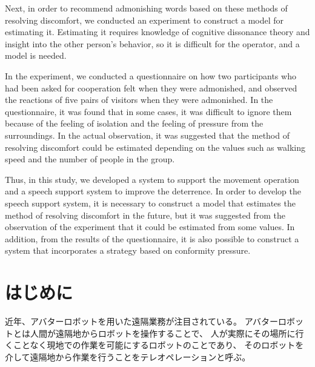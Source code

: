 \documentclass{kuisthesis}
\begin{document}
\begin{eabstract}
Next, in order to recommend admonishing words based on these methods of resolving discomfort, 
we conducted an experiment to construct a model for estimating it.
Estimating it requires knowledge of cognitive dissonance theory 
and insight into the other person's behavior, so it is difficult for the operator, and a model is needed.

In the experiment, we conducted a questionnaire on how two participants who had been asked for cooperation felt 
when they were admonished, and observed the reactions of five pairs of visitors when they were admonished.
In the questionnaire, it was found that in some cases,
it was difficult to ignore them because of the feeling of isolation and the feeling of pressure from the surroundings. 
In the actual observation, it was suggested that the method of resolving 
discomfort could be estimated depending on the values such as walking speed 
and the number of people in the group.

Thus, in this study, we developed a system to support the movement operation and a speech support system to improve the deterrence.
In order to develop the speech support system, it is necessary to construct a model that estimates the method of resolving discomfort in the future, 
but it was suggested from the observation of the experiment that it could be estimated from some values. In addition, from the results of the questionnaire, it is also possible to construct a system that incorporates a strategy based on conformity pressure.

\end{eabstract}

\tableofcontents



\section{はじめに} %
\label{sec: はじめに} %
近年、アバターロボットを用いた遠隔業務が注目されている。
アバターロボットとは人間が遠隔地からロボットを操作することで、
人が実際にその場所に行くことなく現地での作業を可能にするロボットのことであり、
そのロボットを介して遠隔地から作業を行うことをテレオペレーションと呼ぶ。
\end{document}
